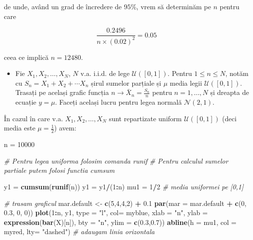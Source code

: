 \documentclass[]{article}
\newenvironment{Shaded}{\begin{snugshade}}{\end{snugshade}}
\newcommand{\KeywordTok}[1]{\textcolor[rgb]{0.13,0.29,0.53}{\textbf{#1}}}
\newcommand{\DataTypeTok}[1]{\textcolor[rgb]{0.13,0.29,0.53}{#1}}
\newcommand{\DecValTok}[1]{\textcolor[rgb]{0.00,0.00,0.81}{#1}}
\newcommand{\FloatTok}[1]{\textcolor[rgb]{0.00,0.00,0.81}{#1}}
\newcommand{\StringTok}[1]{\textcolor[rgb]{0.31,0.60,0.02}{#1}}
\newcommand{\CommentTok}[1]{\textcolor[rgb]{0.56,0.35,0.01}{\textit{#1}}}
\newcommand{\OperatorTok}[1]{\textcolor[rgb]{0.81,0.36,0.00}{\textbf{#1}}}
\newcommand{\NormalTok}[1]{#1}
\newenvironment{frshaded*}{%
  \def\FrameCommand{\fboxrule=\FrameRule\fboxsep=\FrameSep \fcolorbox{framecolor}{shadecolor1}}%
  \MakeFramed {\advance\hsize-\width \FrameRestore}}%
{\endMakeFramed}
\newenvironment{rmdblock}[1]
  {\begin{frshaded*}
  \begin{itemize}
  \renewcommand{\labelitemi}{
    \raisebox{-.7\height}[0pt][0pt]{
      {\setkeys{Gin}{width=2em,keepaspectratio}\texttt{[image: images/icons/\#1]}}
    }
  }
  \item
  }
  {
  \end{itemize}
  \end{frshaded*}
  }
\newenvironment{rmdexercise}
  {\begin{rmdblock}{exercise}}
  {\end{rmdblock}}
\begin{document}
de unde, având un grad de încredere de \(95\%\), vrem să determinăm pe
\(n\) pentru care

\[
  \frac{0.2496}{n\times(0.02)^2} = 0.05
\]

ceea ce implică \(n = 12480\).

\begin{rmdexercise}
Fie \(X_1,X_2,\dots,X_N\), \(N\) v.a. i.i.d. de lege
\(\mathcal{U}([0,1])\). Pentru \(1\leq n\leq N\), notăm cu
\(S_n=X_1+X_2+\cdots X_n\) șirul sumelor parțiale și \(\mu\) media legii
\(\mathcal{U}([0,1])\). Trasați pe același grafic funcția
\(n\to \bar{X}_n=\frac{S_n}{n}\) pentru \(n=1,\dots,N\) și dreapta de
ecuație \(y=\mu\). Faceți același lucru pentru legea normală
\(\mathcal{N}(2,1)\).
\end{rmdexercise}

În cazul în care v.a. \(X_1,X_2,\dots,X_N\) sunt repartizate uniform
\(\mathcal{U}([0,1])\) (deci media este \(\mu=\frac{1}{2}\)) avem:

\begin{Shaded}
\begin{Highlighting}[]
\NormalTok{n =}\StringTok{ }\DecValTok{10000}

\CommentTok{# Pentru legea uniforma folosim comanda runif}
\CommentTok{# Pentru calculul sumelor partiale putem folosi functia cumsum}

\NormalTok{y1 =}\StringTok{ }\KeywordTok{cumsum}\NormalTok{(}\KeywordTok{runif}\NormalTok{(n))}
\NormalTok{y1 =}\StringTok{ }\NormalTok{y1}\OperatorTok{/}\NormalTok{(}\DecValTok{1}\OperatorTok{:}\NormalTok{n)}
\NormalTok{mu1 =}\StringTok{ }\DecValTok{1}\OperatorTok{/}\DecValTok{2} \CommentTok{# media uniformei pe [0,1]}

\CommentTok{# trasam graficul }
\NormalTok{mar.default <-}\StringTok{ }\KeywordTok{c}\NormalTok{(}\DecValTok{5}\NormalTok{,}\DecValTok{4}\NormalTok{,}\DecValTok{4}\NormalTok{,}\DecValTok{2}\NormalTok{) }\OperatorTok{+}\StringTok{ }\FloatTok{0.1}
\KeywordTok{par}\NormalTok{(}\DataTypeTok{mar =}\NormalTok{ mar.default }\OperatorTok{+}\StringTok{ }\KeywordTok{c}\NormalTok{(}\DecValTok{0}\NormalTok{, }\FloatTok{0.3}\NormalTok{, }\DecValTok{0}\NormalTok{, }\DecValTok{0}\NormalTok{)) }
\KeywordTok{plot}\NormalTok{(}\DecValTok{1}\OperatorTok{:}\NormalTok{n, y1, }\DataTypeTok{type =} \StringTok{"l"}\NormalTok{, }
     \DataTypeTok{col=}\NormalTok{ myblue, }\DataTypeTok{xlab =} \StringTok{"n"}\NormalTok{, }
     \DataTypeTok{ylab =} \KeywordTok{expression}\NormalTok{(}\KeywordTok{bar}\NormalTok{(X)[n]), }
     \DataTypeTok{bty =} \StringTok{"n"}\NormalTok{,}
     \DataTypeTok{ylim =} \KeywordTok{c}\NormalTok{(}\FloatTok{0.3}\NormalTok{,}\FloatTok{0.7}\NormalTok{))}
\KeywordTok{abline}\NormalTok{(}\DataTypeTok{h =}\NormalTok{ mu1, }\DataTypeTok{col =}\NormalTok{ myred, }\DataTypeTok{lty=} \StringTok{"dashed"}\NormalTok{) }\CommentTok{# adaugam linia orizontala}
\end{Highlighting}
\end{Shaded}
\end{document}
